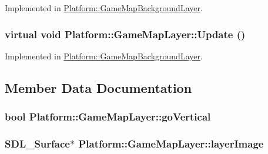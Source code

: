 Implemented in \hyperlink{class_platform_1_1_game_map_background_layer_449a95c15187b1ae358a0216a589df3f}{Platform::GameMapBackgroundLayer}.\hypertarget{class_platform_1_1_game_map_layer_80631a9be3fb03f96ca3565c8860f077}{
\subsubsection[{Update}]{\setlength{\rightskip}{0pt plus 5cm}virtual void Platform::GameMapLayer::Update ()}}
\label{d8/d53/class_platform_1_1_game_map_layer_80631a9be3fb03f96ca3565c8860f077}




Implemented in \hyperlink{class_platform_1_1_game_map_background_layer_6cc21a3c3418b8c76c010963bef37800}{Platform::GameMapBackgroundLayer}.

\subsection{Member Data Documentation}
\hypertarget{class_platform_1_1_game_map_layer_e4f38bbcc758a8099c296f130912f8f6}{
\subsubsection[{goVertical}]{\setlength{\rightskip}{0pt plus 5cm}bool {\bf Platform::GameMapLayer::goVertical}}}
\label{d8/d53/class_platform_1_1_game_map_layer_e4f38bbcc758a8099c296f130912f8f6}


\hypertarget{class_platform_1_1_game_map_layer_b94756f95136f23ec04b70ecb6351e2e}{
\subsubsection[{layerImage}]{\setlength{\rightskip}{0pt plus 5cm}SDL\_\-Surface$\ast$ {\bf Platform::GameMapLayer::layerImage}}}
\label{d8/d53/class_platform_1_1_game_map_layer_b94756f95136f23ec04b70ecb6351e2e}


